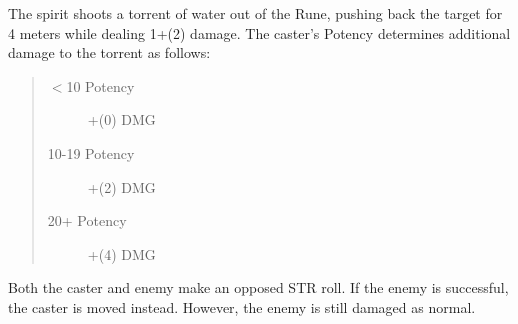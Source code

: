 \documentclass[11pt,a4paper,twocolumn]{book}
\begin{document}
The spirit shoots a torrent of water out of the Rune, pushing back the target for 4 meters while dealing 1+(2) damage. The caster's Potency determines additional damage to the torrent as follows:

\begin{quote}
	\begin{description}
		\item[$<$10 Potency] 	+(0) DMG
		\item[10-19 Potency] 	+(2) DMG
		\item[20+ Potency] 		+(4) DMG
	\end{description}	
\end{quote}

Both the caster and enemy make an opposed STR roll. If the enemy is successful, the caster is moved instead. However, the enemy is still damaged as normal.

\vfill

%	
%
%
\end{document}
